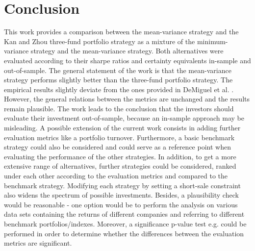 \documentclass{article}
\begin{document}
\section{Conclusion}
This work provides a comparison between the mean-variance strategy and the Kan and Zhou three-fund portfolio strategy as a mixture of the minimum-variance strategy and the mean-variance strategy. Both alternatives were evaluated  according to their sharpe ratios and certainty equivalents in-sample and out-of-sample. The general statement of the work is that the mean-variance strategy performs slightly better than the three-fund portfolio strategy. The empirical results slightly deviate from the ones provided in DeMiguel et al. \cite{DEM09}. However, the general relations between the metrics are unchanged and the results remain plausible. The work leads to the conclusion that the investors should evaluate their investment out-of-sample, because an in-sample approach may be misleading. 
A possible extension of the current work consists in adding further evaluation metrics like a portfolio turnover. Furthermore, a basic benchmark strategy could also be considered and could serve as a reference point when evaluating the performance of the other strategies. In addition, to get a more extensive range of alternatives, further strategies could be considered, ranked under each other according to the evaluation metrics and compared to the benchmark strategy. Modifying each strategy by setting a short-sale constraint also widens the spectrum of possible investments. Besides, a plausibility check would be reasonable - one option would be to perform the analysis on various data sets containing the returns of different companies and referring to different benchmark portfolios/indexes. Moreover, a significance p-value test e.g. could be performed in order to determine whether the differences between the evaluation metrics are significant.      
\medskip
\medskip
\printbibliography
\appendix
\end{document}
